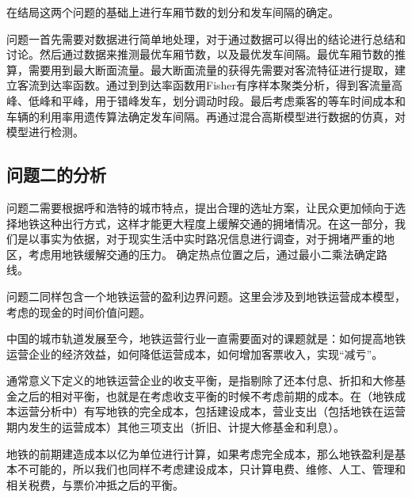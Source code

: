 \documentclass[12pt,a4paper]{mcmthesis}
\begin{document}
 在结局这两个问题的基础上进行车厢节数的划分和发车间隔的确定。

 
 
 
 {问题一首先需要对数据进行简单地处理，对于通过数据可以得出的结论进行总结和讨论。然后通过数据来推测最优车厢节数，以及最优发车间隔。最优车厢节数的推算，需要用到最大断面流量。最大断面流量的获得先需要对客流特征进行提取，建立客流到达率函数。通过到到达率函数用Fisher有序样本聚类分析，得到客流量高峰、低峰和平峰，用于错峰发车，划分调动时段。最后考虑乘客的等车时间成本和车辆的利用率用遗传算法确定发车间隔。再通过混合高斯模型进行数据的仿真，对模型进行检测。}


\subsection{问题二的分析}
问题二需要根据呼和浩特的城市特点，提出合理的选址方案，让民众更加倾向于选择地铁这种出行方式，这样才能更大程度上缓解交通的拥堵情况。在这一部分，我们是以事实为依据，对于现实生活中实时路况信息进行调查，对于拥堵严重的地区，考虑用地铁缓解交通的压力。
确定热点位置之后，通过最小二乘法确定路线。

{问题二同样包含一个地铁运营的盈利边界问题。这里会涉及到地铁运营成本模型，考虑的现金的时间价值问题。}
{中国的城市轨道发展至今，地铁运营行业一直需要面对的课题就是：如何提高地铁运营企业的经济效益，如何降低运营成本，如何增加客票收入，实现“减亏”。
	
通常意义下定义的地铁运营企业的收支平衡，是指剔除了还本付息、折扣和大修基金之后的相对平衡，也就是在考虑收支平衡的时候不考虑前期的成本。在（地铁成本运营分析中）有写地铁的完全成本，包括建设成本，营业支出（包括地铁在运营期内发生的运营成本）其他三项支出（折旧、计提大修基金和利息）。

地铁的前期建造成本以亿为单位进行计算，如果考虑完全成本，那么地铁盈利是基本不可能的，所以我们也同样不考虑建设成本，只计算电费、维修、人工、管理和相关税费，与票价冲抵之后的平衡。}
\end{document}
